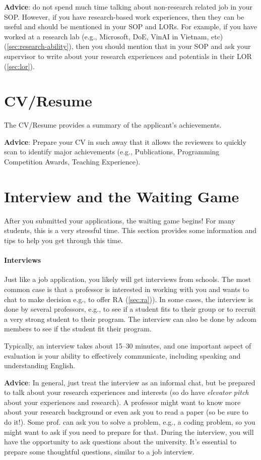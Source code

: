 \documentclass[oneside,11pt,dvipsnames]{book}
\begin{document}
\textbf{Advice}: do not spend much time talking about non-research related job in your SOP.
However, if you have research-based work experiences, then they can be useful and should be mentioned in your SOP and LORs. For example, if you have worked at a research lab (e.g., Microsoft, DoE, VinAI in Vietnam, etc) (\autoref{sec:research-ability}), then you should mention that in your SOP and ask your supervisor to write about your research experiences and potentials in their LOR (\autoref{sec:lor}).


\section{CV/Resume}
The CV/Resume provides a summary of the applicant's achievements.

\textbf{Advice}: Prepare your CV in such away that it allows the reviewers to quickly scan to identify major achievements (e.g., Publications, Programming Competition Awards, Teaching Experience).

\section{Interview and the Waiting Game}\label{sec:interview}

After you submitted your applications, the waiting game begins! For many students, this is a very stressful time. This section provides some information and tips to help you get through this time.

\paragraph{Interviews} Just like a job application, you likely will get interviews from schools. The most common case is that a professor is interested in working with you and wants to chat to make decision e.g., to offer RA (\autoref{sec:ra})). In some cases, the interview is done by several professors, e.g., to see if a student fits to their group or to recruit a very strong student to their program. The interview can also be done by adcom members to see if the student fit their program.

Typically, an interview takes about 15--30 minutes, and one important aspect of evaluation is your ability to effectively communicate, including speaking and understanding English.

\textbf{Advice}: In general, just treat the interview as an informal chat, but be prepared to talk about your research experiences and interests (so do have \emph{elevator pitch} about your experiences and research).
A professor might want to know more about your research background or even ask you to read a paper (so be sure to do it!). Some prof. can ask you to solve a problem, e.g., a coding problem, so you might want to ask if you need to prepare for that.
During the interview, you will have the opportunity to ask questions about the university. It's essential to prepare some thoughtful questions, similar to a job interview.
\end{document}
